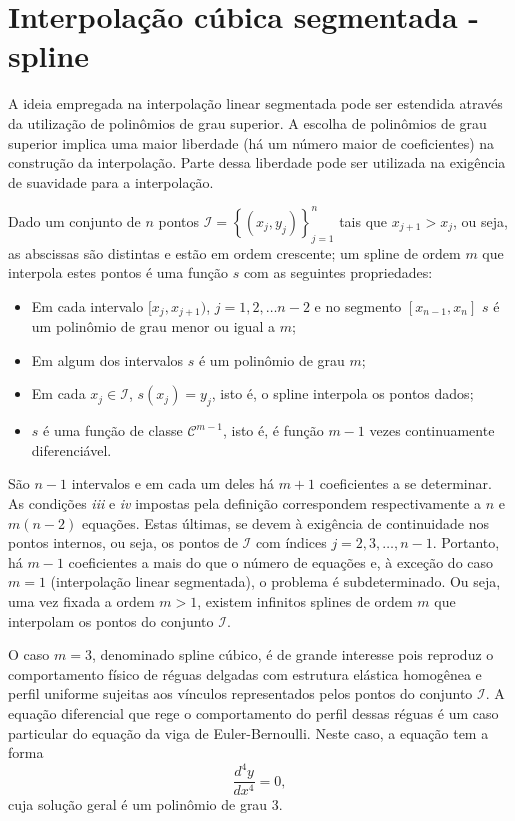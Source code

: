 \section{Interpolação cúbica segmentada - spline}
A ideia empregada na interpolação linear segmentada pode ser estendida através da utilização de polinômios de grau superior. A escolha de polinômios de grau superior implica uma maior liberdade (há um número maior de coeficientes) na construção da interpolação. Parte dessa liberdade pode ser utilizada na exigência de suavidade para a interpolação.

\begin{defn}Dado um conjunto de $n$ pontos $\mathcal{I}=\left\{(x_j,y_j)\right\}_{j=1}^n$ tais que $x_{j+1}>x_j$, ou seja, as abscissas são distintas e estão em ordem crescente; um spline de ordem $m$ que interpola estes pontos é uma função $s$ com as seguintes propriedades:
\begin{itemize}
\item[i)] Em cada intervalo $[x_j,x_{j+1})$, $j=1,2,\ldots n-2$ e no segmento $[x_{n-1},x_n]$ $s$ é um polinômio de grau menor ou igual a  $m$;
\item[ii)] Em algum dos intervalos $s$ é um polinômio de grau $m$;
\item[iii)] Em cada $x_j\in \mathcal{I}$, $s(x_j)=y_j$, isto é, o spline interpola os pontos dados;
\item[iv)] $s$ é uma função de classe $\mathcal{C}^{m-1}$, isto é, é função $m-1$ vezes continuamente diferenciável.
\end{itemize}
\end{defn}

São $n-1$ intervalos e em cada um deles há $m+1$ coeficientes a se determinar. As condições \textit{iii} e \textit{iv} impostas pela definição correspondem respectivamente a $n$ e $m(n-2)$ equações. Estas últimas, se devem à exigência de continuidade nos pontos internos, ou seja, os pontos de $\mathcal{I}$ com índices $j=2,3,\ldots,n-1$. Portanto, há $m-1$ coeficientes a mais do que o número de equações e, à exceção do caso $m=1$ (interpolação linear segmentada), o problema é subdeterminado. Ou seja, uma vez fixada a ordem $m>1$, existem infinitos splines de ordem $m$ que interpolam os pontos do conjunto $\mathcal{I}$.

O caso $m=3$, denominado spline cúbico, é de grande interesse pois reproduz o comportamento físico de réguas delgadas com estrutura elástica homogênea e perfil uniforme sujeitas aos vínculos representados pelos pontos  do conjunto $\mathcal{I}$. A equação diferencial que rege o comportamento do perfil dessas réguas é um caso particular do equação da viga de Euler-Bernoulli. Neste caso, a equação tem a forma
\begin{equation}\label{eq:ed-splin3}
\dfrac{d^4y}{dx^4}=0,
\end{equation}
cuja solução geral é um polinômio de grau 3.


